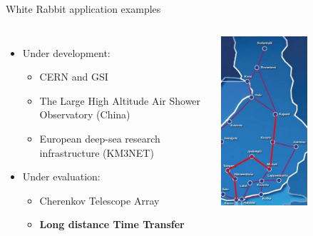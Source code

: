 \documentclass[compress, red]{beamer}
\begin{document}
\begin{frame}{White Rabbit application examples}
\begin{columns}[c]
    \begin{itemize}
      \item Under development:
      \begin{itemize}
	\item CERN and GSI
	\item The Large High Altitude Air Shower Observatory (China)
	\item European deep-sea research infrastructure (KM3NET) 
      \end{itemize}         	
      \item Under evaluation:
      \begin{itemize}
	\item Cherenkov Telescope Array
	\item \textbf{Long distance Time Transfer}
      \end{itemize}         	
    \end{itemize}    
    \begin{center}
      \includegraphics[width=0.6\textwidth]{../../figures/applications/finland.jpg}
      \end{center}
\end{columns}
\end{frame}
\end{document}
